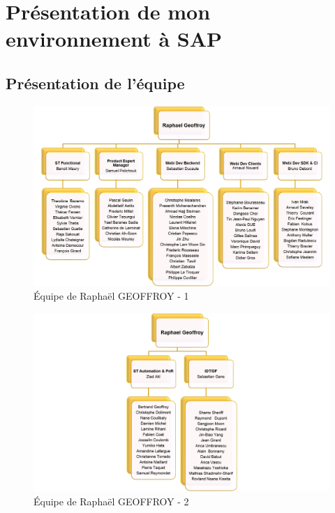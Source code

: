 

\chapter{Pr\'{e}sentation de mon environnement \`{a} SAP}


\section{Présentation de l'équipe}




\begin{figure}[h!]
  \centering
      \includegraphics[width=1.2\textwidth]{images/allRaphaelTeam.png}
  \caption{\'{E}quipe de Rapha\"{e}l GEOFFROY - 1}
	\label{figure:}
\end{figure}


\begin{figure}[h!]
  \centering
      \includegraphics[width=1.2\textwidth]{images/allRaphaelTeam2.png}
  \caption{\'{E}quipe de Rapha\"{e}l GEOFFROY - 2}
	\label{figure:allRaphaelTeam2}
\end{figure}


